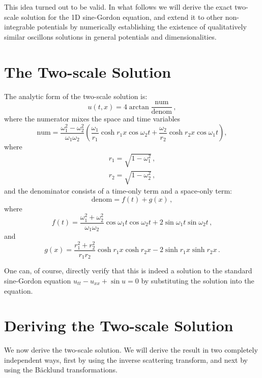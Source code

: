 \documentclass[11pt]{book}
\begin{document}
This idea turned out to be valid. In what follows we will derive the exact two-scale solution for the 1D sine-Gordon equation, and extend it to other non-integrable potentials by numerically establishing the existence of qualitatively similar oscillons solutions in general potentials and dimensionalities.

\section{The Two-scale Solution}
The analytic form of the two-scale solution is:
\begin{equation}\label{twoscale}
  u(t,x)=4 \arctan \frac{\textrm{num}}{\textrm{denom}}\,,
\end{equation}
where the numerator mixes the space and time variables
\begin{equation}\label{num}
  \textrm{num} = \frac{\omega_1^2-\omega_2^2}{\omega_1 \omega_2} \left(\frac{\omega_1}{r_1} \cosh r_1 x \cos\omega_2 t + \frac{\omega_2}{r_2} \cosh r_2 x \cos\omega_1 t \right),
\end{equation}
where
\begin{subequations}
  \begin{align}
  r_1=\sqrt{1-\omega_1^2}\,,\\
  r_2=\sqrt{1-\omega_2^2}\,,
  \end{align}
\end{subequations}
and the denominator consists of a time-only term and a space-only term:
\begin{equation}
    \textrm{denom} = f(t) + g(x)\,,
\end{equation}
where
\begin{equation}\label{denomf}
  f(t) = \frac{\omega_1^2+\omega_2^2}{\omega_1 \omega_2} \cos \omega_1 t \cos \omega_2 t +2 \sin \omega_1 t \sin \omega_2 t\,,
\end{equation}
and
\begin{equation}\label{denomg}
  g(x) = \frac{r_1^2+r_2^2}{r_1 r_2} \cosh r_1 x \cosh r_2 x-2  \sinh r_1 x \sinh r_2 x\,.
\end{equation}

One can, of course, directly verify that this is indeed a solution to the standard sine-Gordon equation $u_{tt}-u_{xx}+\sin u=0$ by substituting the solution into the equation.

\section{Deriving the Two-scale Solution}
We now derive the two-scale solution. We will derive the result in two completely independent ways, first by using the inverse scattering transform, and next by using the B\"acklund transformations.
\end{document}
